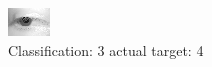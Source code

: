 \begin{figure}[h!]
\begin{center}
\includegraphics[width=0.60\columnwidth]{figures/ID2692_class_3_target_4.png}
\end{center}
\caption{ Classification: 3 actual target: 4}
\label{fig:ID2692_class_3_target_4}
\end{figure}

